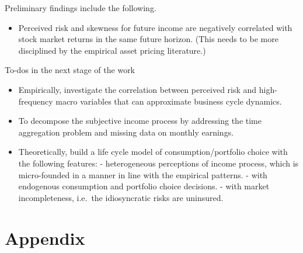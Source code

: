 \documentclass[12pt,notitlepage,onecolumn,aps,pra]{article}
\providecommand{\tightlist}{%
      \setlength{\itemsep}{0pt}\setlength{\parskip}{0pt}}
\begin{document}
Preliminary findings include the following.

\begin{itemize}
\tightlist
\item
  Perceived risk and skewness for future income are negatively
  correlated with stock market returns in the same future horizon. (This
  needs to be more disciplined by the empirical asset pricing
  literature.)
\end{itemize}

To-dos in the next stage of the work

\begin{itemize}
\item
  Empirically, investigate the correlation between perceived risk and
  high-frequency macro variables that can approximate business cycle
  dynamics.
\item
  To decompose the subjective income process by addressing the time
  aggregation problem and missing data on monthly earnings.
\item
  Theoretically, build a life cycle model of consumption/portfolio
  choice with the following features: - heterogeneous perceptions of
  income process, which is micro-founded in a manner in line with the
  empirical patterns. - with endogenous consumption and portfolio choice
  decisions. - with market incompleteness, i.e.~the idiosyncratic risks
  are uninsured.
\end{itemize}

    \hypertarget{appendix}{%
\section{Appendix}\label{appendix}}
\end{document}

